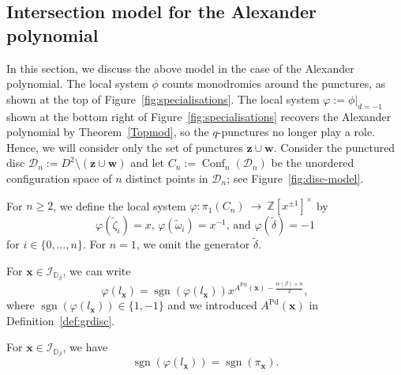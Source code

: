 \documentclass[11pt]{amsart}
\numberwithin{equation}{section}
\numberwithin{figure}{section}
\theoremstyle{definition}
\newcommand{\cD}{\mathcal{D}}
\newcommand{\cI}{\mathcal{I}}
\newcommand{\bD}{\mathbb{D}}
\newcommand{\bZ}{\mathbb{Z}}
\DeclareMathOperator{\Conf}{Conf}
\DeclareMathOperator{\sgn}{\text{sgn}}
\DeclareMathOperator{\Pd}{Pd}
\newcommand{\ws}{\boldsymbol{w}}
\newcommand{\xs}{\boldsymbol{x}}
\newcommand{\zs}{\boldsymbol{z}}
\begin{document}
\subsection{Intersection model for the Alexander polynomial}\label{ss:Alex}
In this section, we discuss the above model in the case of the Alexander polynomial. The local system $\phi$ counts monodromies around the punctures, as shown at the top of Figure~\ref{fig:specialisations}. The local system $\varphi := \phi|_{d=-1}$ shown at the bottom right of Figure~\ref{fig:specialisations} recovers the Alexander polynomial by Theorem~\ref{Topmod}, so the $q$-punctures no longer play a role. Hence, we will consider only the set of punctures $\zs \cup \ws$. Consider the punctured disc $\cD_n := D^2 \setminus (\zs \cup \ws)$ and let $C_n:=\Conf_n(\cD_n)$ be the unordered configuration space of $n$ distinct points in $\cD_n$; see Figure~\ref{fig:disc-model}.

\begin{defn}\label{def:varphi} 
For $n \ge 2$, we define the local system $\varphi: \pi_1\left(C_n \right) \ \rightarrow \ \bZ[x^{\pm 1}]^\times$ by
\begin{equation}
\varphi(\tilde{\zeta}_i)=x \text{, }
\varphi(\tilde{\omega}_i)=x^{-1} \text{, and }
\varphi(\tilde{\delta})=-1
\end{equation}  
for $i \in \{0,\dots,n\}$. For $n=1$, we omit the generator $\tilde{\delta}$.
\end{defn}

For $\xs \in \cI_{\bD_\beta}$, we can write 
\[
\varphi(l_{\xs}) = \sgn(\varphi(l_{\xs})) x^{A^{\Pd}(\xs) - \frac{w(\beta)+n}{2}},
\]
where $\sgn(\varphi(l_{\xs})) \in \{1,-1\}$ and we introduced $A^{\Pd}(\xs)$ in Definition~\ref{def:grdisc}.

\begin{lem}\label{lem:delta}
    For $\xs \in \cI_{\bD_\beta}$, we have
    \[
    \sgn(\varphi(l_{\xs})) = \sgn(\pi_{\xs}).
    \] 
\end{lem}
\end{document}
